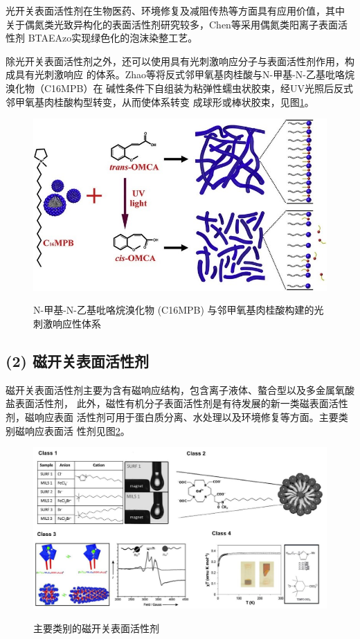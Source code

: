\documentclass[bachelor,fandolfonts,replaceperiod]{jnuthesis}
\begin{document}
    光开关表面活性剂在生物医药、环境修复及减阻传热等方面具有应用价值\cite{刘清斌2018}，其中
    关于偶氮类光致异构化的表面活性剂研究较多，Chen等\cite{chen2016}采用偶氮类阳离子表面活性剂
    BTAEAzo实现绿色化的泡沫染整工艺。
    
    除光开关表面活性剂之外，还可以使用具有光刺激响应分子与表面活性剂作用，构成具有光刺激响应
    的体系。Zhao等\cite{zhao2016}将反式邻甲氧基肉桂酸与N-甲基-N-乙基吡咯烷溴化物（C16MPB）在
    碱性条件下自组装为粘弹性蠕虫状胶束，经UV光照后反式邻甲氧基肉桂酸构型转变，从而使体系转变
    成球形或棒状胶束，见图\ref{fig:switchable-light-omca}。
    
    \begin{figure}[htbp]
        \centering
        \includegraphics[width=.7\textwidth]{figure/switchable-light-omca.jpg}\\
        \caption{N-甲基-N-乙基吡咯烷溴化物 (C16MPB) 与邻甲氧基肉桂酸构建的光刺激响应性体系\cite{zhao2016}}
        \label{fig:switchable-light-omca}
    \end{figure}
        
    \subsection*{(2) 磁开关表面活性剂}
    磁开关表面活性剂主要为含有磁响应结构，包含离子液体、螯合型以及多金属氧酸盐表面活性剂，
    此外，磁性有机分子表面活性剂是有待发展的新一类磁表面活性剂\cite{brown2015}，磁响应表面
    活性剂可用于蛋白质分离、水处理以及环境修复\cite{brown2015}等方面。主要类别磁响应表面活
    性剂见图\ref{fig:switchable-mag}。
    \begin{figure}[htbp]
        \centering
        \includegraphics[width=.985\textwidth]{figure/switchable-mag.jpg}\\
        \caption{主要类别的磁开关表面活性剂\cite{brown2015,brown2012}}
        \label{fig:switchable-mag}
    \end{figure}
    
\end{document}
